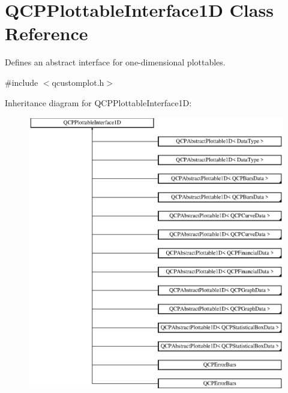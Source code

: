 \hypertarget{class_q_c_p_plottable_interface1_d}{}\section{Q\+C\+P\+Plottable\+Interface1D Class Reference}
\label{class_q_c_p_plottable_interface1_d}


Defines an abstract interface for one-\/dimensional plottables.  




{\ttfamily \#include $<$qcustomplot.\+h$>$}

Inheritance diagram for Q\+C\+P\+Plottable\+Interface1D\+:\begin{figure}[H]
\begin{center}
\leavevmode
\includegraphics[height=12.000000cm]{class_q_c_p_plottable_interface1_d}
\end{center}
\end{figure}
